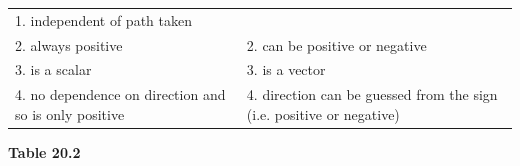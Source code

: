 {\begin{center}
\begin{xtabular*}{\mytablewidth}[t]{|p{10\mystarwidth}|p{10\mystarwidth}|}
    
        1. independent of path taken%
     \tabularnewline{}
    
    
        2. always positive &
    
    
        2. can be positive or negative%
     \tabularnewline{}
    
    
        3. is a scalar &
    
    
        3. is a vector%
     \tabularnewline{}
    
    
        4. no dependence on direction and so is only positive &
    
    
        4. direction can be guessed from the sign (i.e. positive or negative)%
     \tabularnewline{}
    \end{xtabular*}
      \end{center}
    \begin{center}{\small\bfseries Table 20.2}\end{center}
    
    \addtocounter{footnote}{-0}
    
        }%
      
